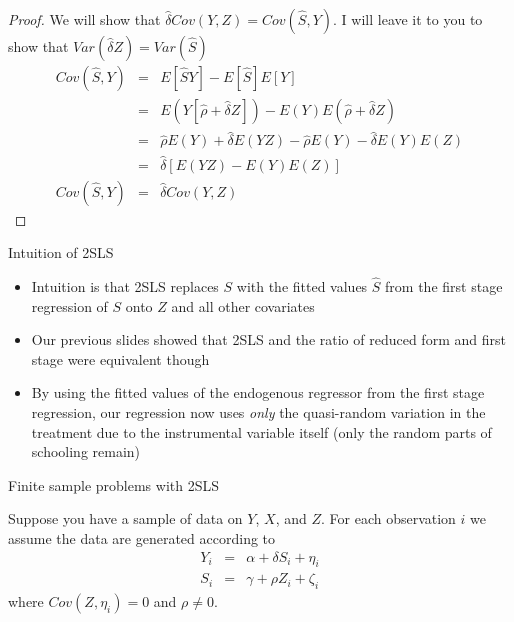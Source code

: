 \documentclass{beamer}
\begin{document}
\begin{frame}[plain]

		\begin{proof}
		We will show that $\widehat{\delta}Cov(Y,Z) = Cov(\widehat{S},Y)$.  I will leave it to you to show that $Var(\widehat{\delta}Z) = Var(\widehat{S})$
		\begin{eqnarray*}
		Cov(\widehat{S},Y) &=& E[\widehat{S}Y] - E[\widehat{S}]E[Y] \\
		&=& E(Y[\widehat{\rho} + \widehat{\delta}Z]) - E(Y)E(\widehat{\rho} + \widehat{\delta}Z) \\
		&=& \widehat{\rho}E(Y) + \widehat{\delta}E(YZ) - \widehat{\rho}E(Y) - \widehat{\delta}E(Y)E(Z) \\
		&=&\widehat{\delta}[E(YZ) - E(Y)E(Z)] \\
		Cov(\widehat{S},Y) &=& \widehat{\delta}Cov(Y,Z)
		\end{eqnarray*}
		\qedhere
		\end{proof}

\end{frame}


\begin{frame}{Intuition of 2SLS}
	
	\begin{itemize}
	\item Intuition is that 2SLS replaces $S$ with the fitted values $\widehat{S}$ from the first stage regression of $S$ onto $Z$ and all other covariates 
	\item Our previous slides showed that 2SLS and the ratio of reduced form and first stage were equivalent though
	\item By using the fitted values of the endogenous regressor from the first stage regression, our regression now uses \emph{only} the quasi-random variation in the treatment due to the instrumental variable itself (only the random parts of schooling remain)
	\end{itemize}
\end{frame}








\begin{frame}{Finite sample problems with 2SLS}

Suppose you have a sample of data on $Y$, $X$, and $Z$. For each observation $i$ we assume the data are generated according to
		\begin{eqnarray*}
		Y_i &=& \alpha + \delta{S}_i + \eta_i \\
		S_i &=& \gamma + \rho{Z}_i + \zeta_i
		\end{eqnarray*}where $Cov(Z,\eta_i)=0$ and $\rho\neq{0}$.

\end{frame}
\end{document}

